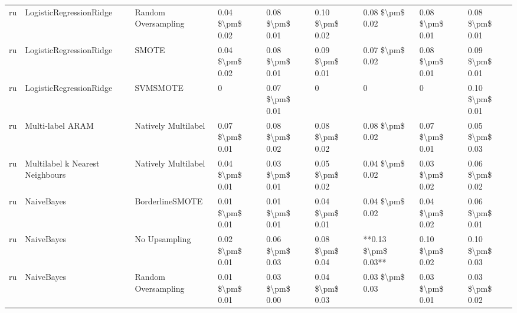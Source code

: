 \begin{tabular}{lllllllll}
      ru &         LogisticRegressionRidge &           Random Oversampling & 0.04 \$\textbackslash pm\$ 0.02 &           0.08 \$\textbackslash pm\$ 0.01 &       0.10 \$\textbackslash pm\$ 0.02 &        0.08 \$\textbackslash pm\$ 0.02 &                         0.08 \$\textbackslash pm\$ 0.01 &     0.08 \$\textbackslash pm\$ 0.01 \\
      ru &         LogisticRegressionRidge &                         SMOTE & 0.04 \$\textbackslash pm\$ 0.02 &           0.08 \$\textbackslash pm\$ 0.01 &       0.09 \$\textbackslash pm\$ 0.01 &        0.07 \$\textbackslash pm\$ 0.02 &                         0.08 \$\textbackslash pm\$ 0.01 &     0.09 \$\textbackslash pm\$ 0.01 \\
      ru &         LogisticRegressionRidge &                      SVMSMOTE &               0 &           0.07 \$\textbackslash pm\$ 0.01 &                     0 &                      0 &                                       0 &     0.10 \$\textbackslash pm\$ 0.01 \\
      ru &                Multi-label ARAM &           Natively Multilabel & 0.07 \$\textbackslash pm\$ 0.01 &           0.08 \$\textbackslash pm\$ 0.02 &       0.08 \$\textbackslash pm\$ 0.02 &        0.08 \$\textbackslash pm\$ 0.02 &                         0.07 \$\textbackslash pm\$ 0.01 &     0.05 \$\textbackslash pm\$ 0.03 \\
      ru & Multilabel k Nearest Neighbours &           Natively Multilabel & 0.04 \$\textbackslash pm\$ 0.01 &           0.03 \$\textbackslash pm\$ 0.01 &       0.05 \$\textbackslash pm\$ 0.02 &        0.04 \$\textbackslash pm\$ 0.02 &                         0.03 \$\textbackslash pm\$ 0.02 &     0.06 \$\textbackslash pm\$ 0.02 \\
      ru &                      NaiveBayes &               BorderlineSMOTE & 0.01 \$\textbackslash pm\$ 0.01 &           0.01 \$\textbackslash pm\$ 0.01 &       0.04 \$\textbackslash pm\$ 0.01 &        0.04 \$\textbackslash pm\$ 0.02 &                         0.04 \$\textbackslash pm\$ 0.02 &     0.06 \$\textbackslash pm\$ 0.01 \\
      ru &                      NaiveBayes &                 No Upsampling & 0.02 \$\textbackslash pm\$ 0.01 &           0.06 \$\textbackslash pm\$ 0.03 &       0.08 \$\textbackslash pm\$ 0.04 &    **0.13 \$\textbackslash pm\$ 0.03** &                         0.10 \$\textbackslash pm\$ 0.02 &     0.10 \$\textbackslash pm\$ 0.03 \\
      ru &                      NaiveBayes &           Random Oversampling & 0.01 \$\textbackslash pm\$ 0.01 &           0.03 \$\textbackslash pm\$ 0.00 &       0.04 \$\textbackslash pm\$ 0.03 &        0.03 \$\textbackslash pm\$ 0.03 &                         0.03 \$\textbackslash pm\$ 0.01 &     0.03 \$\textbackslash pm\$ 0.02 \\

\end{tabular}
